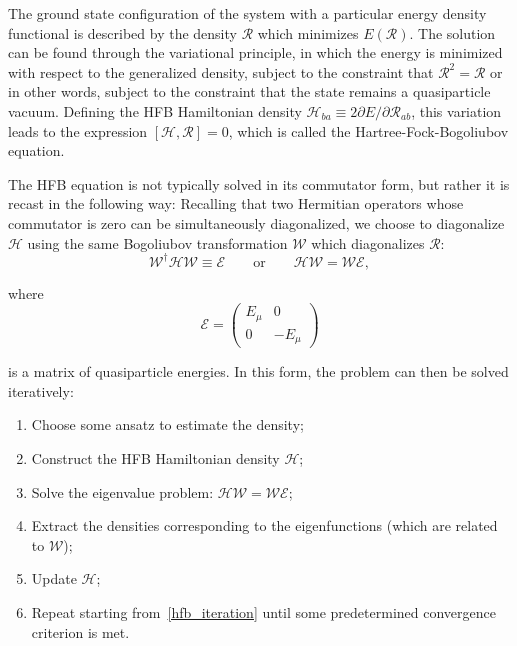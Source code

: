 The ground state configuration of the system with a particular energy density functional is described by the density $\mathcal{R}$ which minimizes $E(\mathcal{R})$. The solution can be found through the variational principle, in which the energy is minimized with respect to the generalized density, subject to the constraint that $\mathcal{R}^2=\mathcal{R}$ \textminus or in other words, subject to the constraint that the state remains a quasiparticle vacuum. Defining the HFB Hamiltonian density $\mathcal{H}_{ba} \equiv 2 \partial E/\partial \mathcal{R}_{ab}$, this variation leads to the expression $\left[\mathcal{H},\mathcal{R}\right]=0$, which is called the Hartree-Fock-Bogoliubov equation.

The HFB equation is not typically solved in its commutator form, but rather it is recast in the following way: Recalling that two Hermitian operators whose commutator is zero can be simultaneously diagonalized, we choose to diagonalize $\mathcal{H}$ using the same Bogoliubov transformation $\mathcal{W}$ which diagonalizes $\mathcal{R}$:
\begin{equation}
\mathcal{W}^\dagger \mathcal{H} \mathcal{W} \equiv \mathcal{E} \qquad\mathrm{or}\qquad \mathcal{H}\mathcal{W} = \mathcal{W}\mathcal{E},
\end{equation}

\noindent where
\begin{equation}
\mathcal{E} = \left(\begin{array}{cc}
E_\mu & 0 \\
0 & -E_\mu
\end{array}\right)
\end{equation}

\noindent is a matrix of quasiparticle energies. In this form, the problem can then be solved iteratively:
\begin{enumerate}
	\setlength\itemsep{-2em}
	\item Choose some ansatz to estimate the density;\\
	\item Construct the HFB Hamiltonian density $\mathcal{H}$;\\
	\item Solve the eigenvalue problem: $\mathcal{H}\mathcal{W} = \mathcal{W}\mathcal{E}$; \label{hfb_iteration}\\
	\item Extract the densities corresponding to the eigenfunctions (which are related to $\mathcal{W}$);\\
	\item Update $\mathcal{H}$; \\
	\item Repeat starting from~\ref{hfb_iteration} until some predetermined convergence criterion is met.
\end{enumerate}

